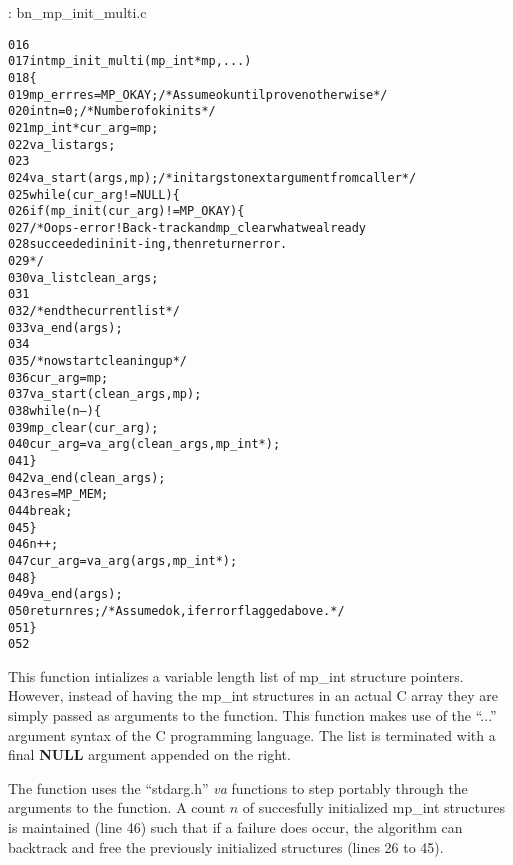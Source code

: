 \documentclass[b5paper]{book}
\begin{document}
\vspace{+3mm}\begin{small}
\hspace{-5.1mm}{\bf File}: bn\_mp\_init\_multi.c
\vspace{-3mm}
\begin{alltt}
016   
017   int mp_init_multi(mp_int *mp, ...) 
018   \{
019       mp_err res = MP_OKAY;      /* Assume ok until proven otherwise */
020       int n = 0;                 /* Number of ok inits */
021       mp_int* cur_arg = mp;
022       va_list args;
023   
024       va_start(args, mp);        /* init args to next argument from caller */
025       while (cur_arg != NULL) \{
026           if (mp_init(cur_arg) != MP_OKAY) \{
027               /* Oops - error! Back-track and mp_clear what we already
028                  succeeded in init-ing, then return error.
029               */
030               va_list clean_args;
031               
032               /* end the current list */
033               va_end(args);
034               
035               /* now start cleaning up */            
036               cur_arg = mp;
037               va_start(clean_args, mp);
038               while (n--) \{
039                   mp_clear(cur_arg);
040                   cur_arg = va_arg(clean_args, mp_int*);
041               \}
042               va_end(clean_args);
043               res = MP_MEM;
044               break;
045           \}
046           n++;
047           cur_arg = va_arg(args, mp_int*);
048       \}
049       va_end(args);
050       return res;                /* Assumed ok, if error flagged above. */
051   \}
052   
\end{alltt}
\end{small}

This function intializes a variable length list of mp\_int structure pointers.  However, instead of having the mp\_int
structures in an actual C array they are simply passed as arguments to the function.  This function makes use of the 
``...'' argument syntax of the C programming language.  The list is terminated with a final \textbf{NULL} argument 
appended on the right.  

The function uses the ``stdarg.h'' \textit{va} functions to step portably through the arguments to the function.  A count
$n$ of succesfully initialized mp\_int structures is maintained (line 46) such that if a failure does occur,
the algorithm can backtrack and free the previously initialized structures (lines 26 to 45).  
\end{document}
